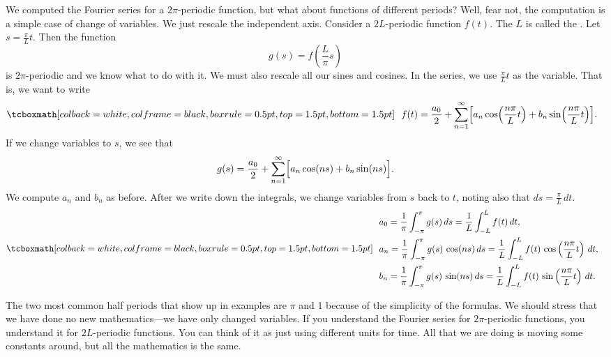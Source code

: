 We computed the Fourier series for a $2\pi$-periodic function, but what
about functions of different periods?  Well, fear not, the computation is a
simple case of change of variables.  We just rescale the independent
axis.  Consider a $2L$-periodic function $f(t)$.  The $L$ is called
the \emph{}.  Let $s = \frac{\pi}{L}  t$.
Then the function
\begin{equation*}
g(s) = f\left(\frac{L}{\pi} s \right)
\end{equation*}
is $2\pi$-periodic and we know what to do with it.
We must also rescale all our sines and cosines.
In the series, we use $\frac{\pi}{L} t$ as the variable.  That is, we
want to write
\begin{equation*}
\mybxbg{~~
f(t) = 
\frac{a_0}{2} +
\sum_{n=1}^\infty
\Bigl[
a_n \cos \Bigl( \frac{n \pi}{L} t \Bigr)
+ b_n \sin \Bigl(\frac{n \pi}{L} t \Bigr)
\Bigr] .
~~}
\end{equation*}
If we change variables to $s$, we see that
\begin{equation*}
g(s) = 
\frac{a_0}{2} +
\sum_{n=1}^\infty
\Bigl[
a_n \cos (n s)
+ b_n \sin (n s)
\Bigr] .
\end{equation*}
We compute $a_n$ and $b_n$ as before.  After we write down the
integrals, we change variables from $s$ back to $t$, noting also
that $ds = \frac{\pi}{L} \, dt$.
\begin{equation*}
\mybxbg{~~
\begin{aligned}
& a_0 =
\frac{1}{\pi}
\int_{-\pi}^\pi
g(s) \, ds
=
\frac{1}{L}
\int_{-L}^L
f(t) \, dt , \\
& a_n =
\frac{1}{\pi}
\int_{-\pi}^\pi
g(s) \, \cos (n s) \, ds
=
\frac{1}{L}
\int_{-L}^L
f(t) \, \cos \left( \frac{n \pi}{L} t \right) \, dt , \\
& b_n =
\frac{1}{\pi}
\int_{-\pi}^\pi
g(s) \, \sin (n s) \, ds
=
\frac{1}{L}
\int_{-L}^L
f(t) \, \sin \left( \frac{n \pi}{L} t \right) \, dt .
\end{aligned}
~~}
\end{equation*}

The two most common half periods that show up in examples
are $\pi$ and 1 because of the simplicity of the formulas.  We should stress that we have
done no new mathematics---we have only changed variables.
If you understand 
the Fourier series for $2\pi$-periodic functions, you understand it for
$2L$-periodic functions.  You can think of it as just using
different units for time.  All that we are doing is moving some constants
around, but all the mathematics is the same.

